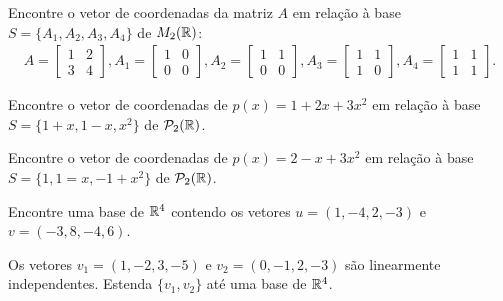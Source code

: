 \documentclass[12pt]{exam}
\begin{document}
    \begin{exercicio}
        Encontre o vetor de coordenadas da matriz $A$ em relação à base $S = \{A_1, A_2, A_3, A_4\}$ de $M_2(\mathbb{R})$:
        \begin{align*}
            A = \begin{bmatrix}
                1 & 2\\
                3 & 4
            \end{bmatrix},
            A_1 = \begin{bmatrix}
                1 & 0\\
                0 & 0
            \end{bmatrix},
            A_2 = \begin{bmatrix}
                1 & 1\\
                0 & 0
            \end{bmatrix},
            A_3 = \begin{bmatrix}
                1 & 1\\
                1 & 0
            \end{bmatrix},
            A_4 = \begin{bmatrix}
                1 & 1\\
                1 & 1
            \end{bmatrix}.
        \end{align*}
    \end{exercicio}

    \begin{exercicio}
        Encontre o vetor de coordenadas de $p(x) = 1 + 2x + 3x^2$ em relação à base $S = \{1 + x, 1 - x, x^2\}$ de $\mathcal{P}_2(\mathbb{R})$.
    \end{exercicio}

    \begin{exercicio}
        Encontre o vetor de coordenadas de $p(x) = 2 - x + 3x^2$ em relação à base $S = \{1, 1 = x, -1 + x^2\}$ de $\mathcal{P}_2(\mathbb{R})$.
    \end{exercicio}

    \begin{exercicio}
        Encontre uma base de $\mathbb{R}^4$ contendo os vetores $u = (1, -4, 2, -3)$ e $v = (-3, 8, -4, 6)$.
    \end{exercicio}

    \begin{exercicio}
        Os vetores $v_1 = (1, -2, 3, -5)$ e $v_2 = (0, -1, 2, -3)$ são linearmente independentes. Estenda $\{v_1, v_2\}$ até uma base de $\mathbb{R}^4$.
    \end{exercicio}
\end{document}
